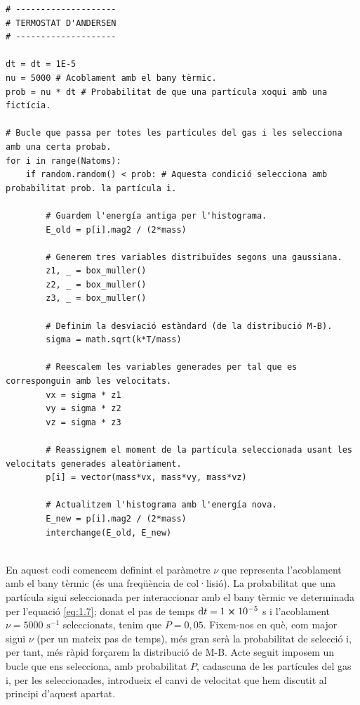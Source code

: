 \documentclass[a4paper,10.5pt]{report}
\begin{document}
\begin{lstlisting}[caption={Termostat d'Andersen.}]
# --------------------
# TERMOSTAT D'ANDERSEN
# --------------------

dt = dt = 1E-5
nu = 5000 # Acoblament amb el bany tèrmic.
prob = nu * dt # Probabilitat de que una partícula xoqui amb una fictícia.
	
# Bucle que passa per totes les partícules del gas i les selecciona amb una certa probab.
for i in range(Natoms):
	if random.random() < prob: # Aquesta condició selecciona amb probabilitat prob. la partícula i.
			
		# Guardem l'energía antiga per l'histograma.
		E_old = p[i].mag2 / (2*mass)
			
		# Generem tres variables distribuïdes segons una gaussiana.
		z1, _ = box_muller()
		z2, _ = box_muller()
		z3, _ = box_muller()
				
		# Definim la desviació estàndard (de la distribució M-B).
		sigma = math.sqrt(k*T/mass)
				
		# Reescalem les variables generades per tal que es corresponguin amb les velocitats.
		vx = sigma * z1
		vy = sigma * z2
		vz = sigma * z3
				
		# Reassignem el moment de la partícula seleccionada usant les velocitats generades aleatòriament.
		p[i] = vector(mass*vx, mass*vy, mass*vz)
			
		# Actualitzem l'histograma amb l'energía nova.
		E_new = p[i].mag2 / (2*mass)
		interchange(E_old, E_new)
				
\end{lstlisting}

En aquest codi comencem definint el paràmetre $\nu$ que representa l'acoblament amb el bany tèrmic (és una freqüència de col·lisió). La probabilitat que una partícula sigui seleccionada per interaccionar amb el bany tèrmic ve determinada per l'equació \eqref{eq:1.7}; donat el pas de temps $\mathrm{d}t = 1 \cross 10^{-5}$ s i l'acoblament $\nu = 5000 \text{ s}^{-1}$ seleccionats, tenim que $P = 0,05$. Fixem-nos en què, com major sigui $\nu$ (per un mateix pas de temps), més gran serà la probabilitat de selecció i, per tant, més ràpid forçarem la distribució de M-B.  Acte seguit imposem un bucle que ens selecciona, amb probabilitat $P$, cadascuna de les partícules del gas i, per les seleccionades, introdueix el canvi de velocitat que hem discutit al principi d'aquest apartat. 
\end{document}
